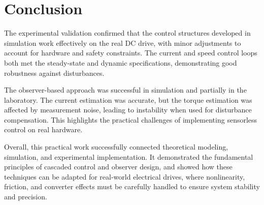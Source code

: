 \documentclass{rapportCS}
\begin{document}
\section{Conclusion}
The experimental validation confirmed that the control structures developed in simulation work effectively on the real DC drive, with minor adjustments to account for hardware and safety constraints. 
The current and speed control loops both met the steady-state and dynamic specifications, demonstrating good robustness against disturbances.

The observer-based approach was successful in simulation and partially in the laboratory. 
The current estimation was accurate, but the torque estimation was affected by measurement noise, leading to instability when used for disturbance compensation. 
This highlights the practical challenges of implementing sensorless control on real hardware.

Overall, this practical work successfully connected theoretical modeling, simulation, and experimental implementation. 
It demonstrated the fundamental principles of cascaded control and observer design, and showed how these techniques can be adapted for real-world electrical drives, where nonlinearity, friction, and converter effects must be carefully handled to ensure system stability and precision.






\newpage
\end{document}
